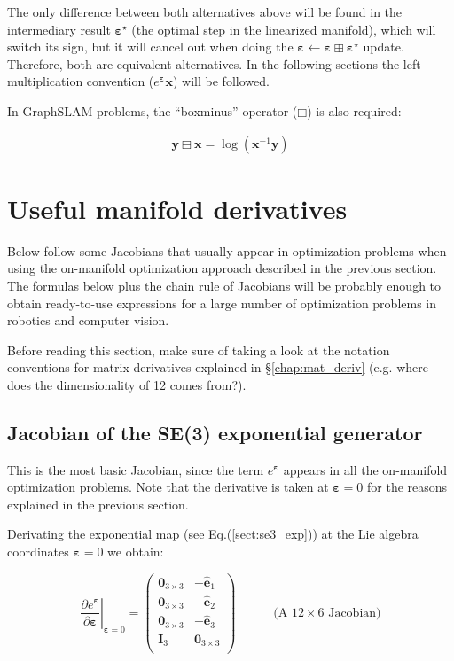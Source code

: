 \documentclass[a4paper,11pt]{report}
\newcommand{\E}{{\bm{\varepsilon}}}
\begin{document}
The only difference between both alternatives above
will be found in the intermediary result $\E^\star$
(the optimal step in the linearized manifold),
which will switch its sign, but it will cancel out
when doing the $\E \leftarrow \E \boxplus \E^\star$ update.
Therefore, both are equivalent alternatives.
In the following sections the left-multiplication convention ($e^\E \mathbf{x}$)
will be followed.

In GraphSLAM problems, the ``boxminus'' operator ($\boxminus$) is also required:

\begin{eqnarray}
\label{eq:boxminus}
 \mathbf{y} \boxminus \mathbf{x} = \log( \mathbf{x}^{-1} \mathbf{y} )
\end{eqnarray}


\section{Useful manifold derivatives}
\label{chap:se3_lie:deriv}

Below follow some Jacobians that usually appear in optimization problems
when using the on-manifold optimization approach described in the previous section.
The formulas below plus the chain rule of Jacobians will be probably enough
to obtain ready-to-use expressions for a large number of optimization problems
in robotics and computer vision.

Before reading this section, make sure of taking a look at the notation conventions
for matrix derivatives explained in \S\ref{chap:mat_deriv}
(e.g. where does the dimensionality of 12 comes from?).


\subsection{Jacobian of the SE(3) exponential generator}
\label{sect:jacob_se3_gen}

This is the most basic Jacobian, since the term $e^\E$ appears in all
the on-manifold optimization problems.
Note that the derivative is taken at $\E=0$ for the reasons explained
in the previous section.

Derivating the exponential map (see Eq.(\ref{sect:se3_exp})) at the Lie algebra
coordinates $\E=0$ we obtain:

\begin{equation}
\left. \frac{\partial e^\E}{\partial \E} \right|_{\E=0}
=
\left(
\begin{array}{cc}
 \mathbf{0}_{3\times 3}  & -\hat{\mathbf{e}}_1 \\
 \mathbf{0}_{3\times 3}  & -\hat{\mathbf{e}}_2 \\
 \mathbf{0}_{3\times 3}  & -\hat{\mathbf{e}}_3 \\
 \mathbf{I}_{3}  & \mathbf{0}_{3\times 3} \\
\end{array}
\right)
\quad\quad\quad \text{(A $12 \times 6$ Jacobian)}
\end{equation}
\end{document}
